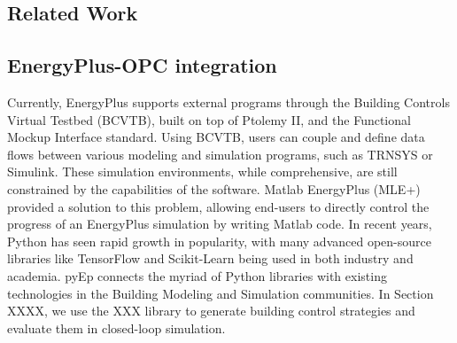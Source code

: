 \subsection{Related Work}

\subsection{EnergyPlus-OPC integration}
Currently, EnergyPlus supports external programs through the Building Controls Virtual Testbed (BCVTB), built on top of Ptolemy II, and the Functional Mockup Interface standard. Using BCVTB, users can couple and define data flows between various modeling and simulation programs, such as TRNSYS or Simulink. These simulation environments, while comprehensive, are still constrained by the capabilities of the software. Matlab EnergyPlus (MLE+) provided a solution to this problem, allowing end-users to directly control the progress of an EnergyPlus simulation by writing Matlab code. In recent years, Python has seen rapid growth in popularity, with many advanced open-source libraries like TensorFlow and Scikit-Learn being used in both industry and academia. pyEp connects the myriad of Python libraries with existing technologies in the Building Modeling and Simulation communities. In Section XXXX, we use the XXX library to generate building control strategies and evaluate them in closed-loop simulation.

